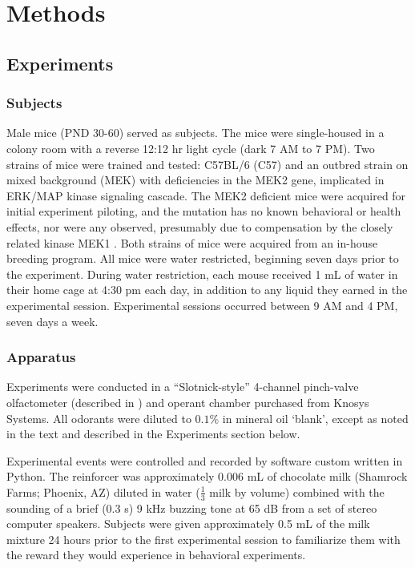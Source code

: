 \section*{Methods}
\label{sec:methods}
\subsection*{Experiments}

\subsubsection*{Subjects}
\label{sec:methods_subjects}
Male mice (PND 30-60) served as subjects. The mice were single-housed in a colony room with a reverse 12:12 hr light cycle (dark 7 AM to 7 PM). Two strains of mice were trained and tested: C57BL/6 (C57) and an outbred strain on mixed background (MEK) with deficiencies in the MEK2 gene, implicated in ERK/MAP kinase signaling cascade. The MEK2 deficient mice were acquired for initial experiment piloting, and the mutation has no known behavioral or health effects, nor were any observed, presumably due to compensation by the closely related kinase MEK1 \cite{12832465}. Both strains of mice were acquired from an in-house breeding program. All mice were water restricted, beginning seven days prior to the experiment. During water restriction, each mouse received 1 mL of water in their home cage at 4:30 pm each day, in addition to any liquid they earned in the experimental session. Experimental sessions occurred between 9 AM and 4 PM, seven days a week.

\subsubsection*{Apparatus}
\label{sec:methods_apparatus}
Experiments were conducted in a ``Slotnick-style'' 4-channel pinch-valve olfactometer (described in \cite{18428626}) and operant chamber purchased from Knosys Systems. All odorants were diluted to $0.1\%$ in mineral oil `blank', except as noted in the text and described in the Experiments section below.

Experimental events were controlled and recorded by software custom written in Python. The reinforcer was approximately 0.006 mL of chocolate milk (Shamrock Farms; Phoenix, AZ) diluted in water ($\frac{1}{3}$ milk by volume) combined with the sounding of a brief (0.3 s) 9 kHz buzzing tone at 65 dB from a set of stereo computer speakers. Subjects were given approximately 0.5 mL of the milk mixture 24 hours prior to the first experimental session to familiarize them with the reward they would experience in behavioral experiments.  

